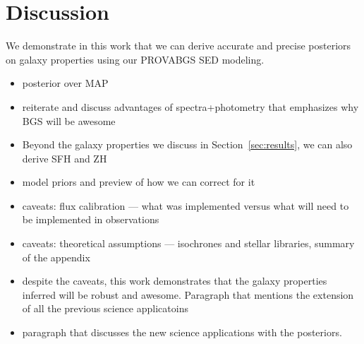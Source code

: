 \section{Discussion} \label{sec:discuss}
We demonstrate in this work that we can derive accurate and precise posteriors
on galaxy properties using our {\sc PROVABGS} SED modeling. 


\begin{itemize}
    \item posterior over MAP
    \item reiterate and discuss advantages of spectra+photometry that
        emphasizes why BGS will be awesome
    \item Beyond the galaxy properties we discuss in Section~\ref{sec:results},
        we can also derive SFH and ZH
    \item model priors and preview of how we can correct for it
    \item caveats: flux calibration --- what was implemented versus what will
        need to be implemented in observations
    \item caveats: theoretical assumptions --- isochrones and stellar
        libraries, summary of the appendix
    \item despite the caveats, this work demonstrates that the galaxy
        properties inferred will be robust and awesome. Paragraph that mentions
        the extension of all the previous science applicatoins 
    \item paragraph that discusses the new science applications with the
        posteriors. 
\end{itemize}


